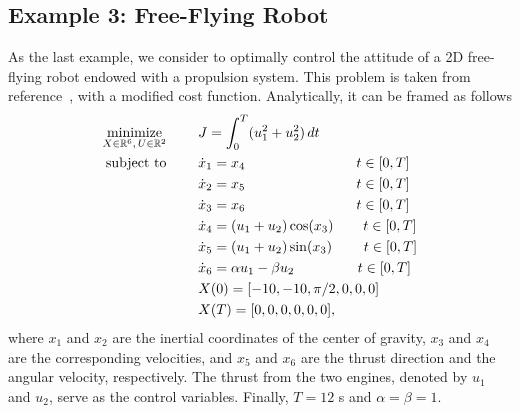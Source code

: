 \subsection*{Example 3: Free-Flying Robot}
As the last example, we consider to optimally control the attitude of a 2D free-flying robot endowed with a propulsion system. This problem is taken from reference~\cite{Betts:book:2010}, with a modified cost function. Analytically, it can be framed as follows
\begin{subequations}\label{eq:free}
	\begin{align}
	\underset{X \in \mathbb{R}^{6}, \, U \in \mathbb{R}^{2}}{\text{minimize}}\hspace{8mm}
	&J = \int_{0}^{T}(u_{1}^{2} +  u_{2}^{2})\,dt  \label{eq:freecost}\\
	\text{subject to} \hspace{8mm}
	& \dot{x}_1 = x_4 \hspace{28mm} t \in[0,T] \label{eq:freedyn1}\\
	& \dot{x}_2 = x_5 \hspace{28mm} t \in[0,T] \label{eq:freedyn2}\\
	& \dot{x}_3 = x_6\hspace{28mm} t \in[0,T] \label{eq:freedyn3}\\
	& \dot{x}_4 = (u_1 + u_2)\cos(x_3)\hspace{7.5mm} t \in[0,T] \label{eq:freedyn4}\\
	& \dot{x}_5 = (u_1 + u_2)\sin(x_3)\hspace{8mm} t \in[0,T] \label{eq:freedyn5}\\
	& \dot{x}_6 = \alpha u_1 - \beta u_2\hspace{16mm} t \in[0,T] \label{eq:freedyn6}\\
	&X(0) = [-10, -10, \pi/2, 0, 0, 0]\\
	&X(T) = [0, 0, 0, 0, 0, 0], \label{eq:freefinal1}		
	\end{align}
\end{subequations}
where $x_1$ and $x_2$ are the inertial coordinates of the center of gravity, $x_3$ and $x_4$ are the corresponding velocities, and $x_5$ and $x_6$ are the thrust direction and the angular velocity, respectively. The thrust from the two engines, denoted by $u_1$ and $u_2$, serve as the control variables. Finally, $T = 12$ s and $\alpha = \beta = 1$.
